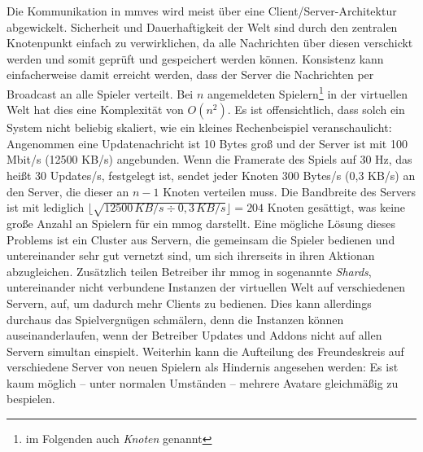 Die Kommunikation in \acp{mmve} wird meist über eine Client/Server-Architektur abgewickelt. Sicherheit und Dauerhaftigkeit der Welt sind durch den zentralen Knotenpunkt einfach zu verwirklichen, da alle Nachrichten über diesen verschickt werden und somit geprüft und gespeichert werden können. Konsistenz kann einfacherweise damit erreicht werden, dass der Server die Nachrichten per Broadcast an alle Spieler verteilt. Bei $n$ angemeldeten Spielern\footnote{im Folgenden auch \emph{Knoten} genannt} in der virtuellen Welt hat dies eine Komplexität von $O(n^2)$.  Es ist offensichtlich, dass solch ein System nicht beliebig skaliert, wie ein kleines Rechenbeispiel veranschaulicht: Angenommen eine Updatenachricht ist 10 Bytes groß und der Server ist mit 100 Mbit/s (12500 KB/s) angebunden. Wenn die Framerate des Spiels auf 30 Hz, das heißt 30 Updates/s, festgelegt ist, sendet jeder Knoten 300 Bytes/s (0,3 KB/s) an den Server, die dieser an $n-1$ Knoten verteilen muss. Die Bandbreite des Servers ist mit lediglich $\lfloor\sqrt{12500\,KB/s \div 0,3\,KB/s}\rfloor = 204$ Knoten gesättigt, was keine große Anzahl an Spielern für ein \ac{mmog} darstellt. Eine mögliche Lösung dieses Problems ist ein Cluster aus Servern, die gemeinsam die Spieler bedienen und untereinander sehr gut vernetzt sind, um sich ihrerseits in ihren Aktionan abzugleichen. Zusätzlich teilen Betreiber ihr \ac{mmog} in sogenannte \emph{Shards}, untereinander nicht verbundene Instanzen der virtuellen Welt auf verschiedenen Servern, auf, um dadurch mehr Clients zu bedienen. Dies kann allerdings durchaus das Spielvergnügen schmälern, denn die Instanzen können auseinanderlaufen, wenn der Betreiber Updates und Addons nicht auf allen Servern simultan einspielt. Weiterhin kann die Aufteilung des Freundeskreis auf verschiedene Server von neuen Spielern als Hindernis angesehen werden: Es ist kaum möglich -- unter normalen Umständen -- mehrere Avatare gleichmäßig zu bespielen.

